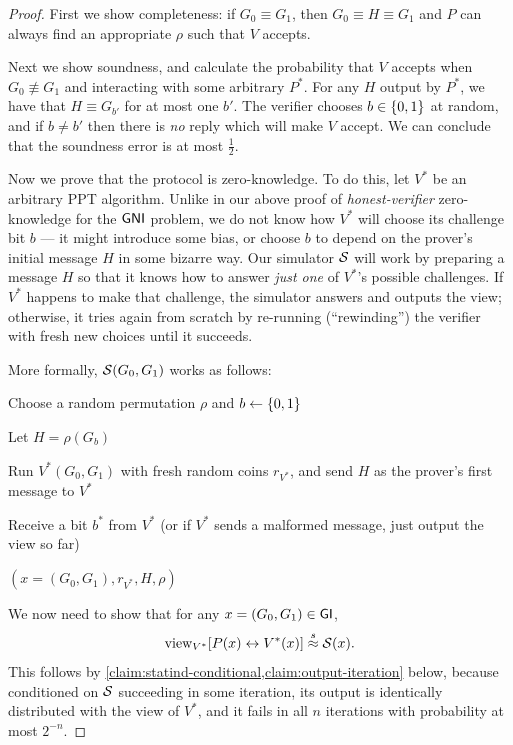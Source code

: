 \documentclass[11pt]{article}
\begin{document}
\begin{proof}
  First we show completeness: if $G_0 \equiv G_1$, then $G_0 \equiv H
  \equiv G_1$ and $P$ can always find an appropriate $\rho$ such that
  $V$ accepts.

  Next we show soundness, and calculate the probability that $V$
  accepts when $G_0 \not\equiv G_1$ and interacting with some
  arbitrary $P^{*}$.  For any $H$ output by $P^{*}$, we have that $H
  \equiv G_{b'}$ for at most one $b'$.  The verifier chooses $b \in
  \{0,1\}$ at random, and if $b\neq b'$ then there is \emph{no} reply
  which will make $V$ accept.  We can conclude that the soundness
  error is at most $\frac{1}{2}$.

  Now we prove that the protocol is zero-knowledge.  To do this, let
  $V^{*}$ be an arbitrary PPT algorithm.  Unlike in our above proof
  of \emph{honest-verifier} zero-knowledge for the $\mathsf{GNI}$ problem, we
  do not know how $V^{*}$ will choose its challenge bit $b$ --- it
  might introduce some bias, or choose $b$ to depend on the prover's
  initial message $H$ in some bizarre way.  Our simulator $\mathcal{S}$ will
  work by preparing a message $H$ so that it knows how to answer
  \emph{just one} of $V^{*}$'s possible challenges.  If $V^{*}$
  happens to make that challenge, the simulator answers and outputs
  the view; otherwise, it tries again from scratch by re-running
  (``rewinding'') the verifier with fresh new choices until it
  succeeds.

  More formally, $\mathcal{S}(G_{0},G_{1})$ works as follows: 
  \begin{algorithmic}
    \REPEAT

    \STATE Choose a random permutation $\rho$ and $b \gets \{0,1\}$

    \STATE Let $H= \rho(G_b)$

    \STATE Run $V^*(G_{0}, G_{1})$ with fresh random coins $r_{V^*}$,
    and send $H$ as the prover's first message to $V^{*}$

    \STATE Receive a bit $b^{*}$ from $V^*$ (or if $V^{*}$ sends a
    malformed message, just output the view so far)


    \RETURN $(x = (G_{0}, G_{1}), r_{V^*}, H, \rho)$
  \end{algorithmic}

  We now need to show that for any $x = (G_{0},G_{1}) \in \mathsf{GI}$,
  \[ \text{view}_{V^{*}} [ P(x) \leftrightarrow V^{*}(x) ] \stackrel{s}{\approx}
    \mathcal{S}(x). \] This follows by
  \cref{claim:statind-conditional,claim:output-iteration} below,
  because conditioned on $\mathcal{S}$ succeeding in some iteration, its
  output is identically distributed with the view of $V^{*}$, and it
  fails in all $n$ iterations with probability at most $2^{-n}$.
\end{proof}
\end{document}

